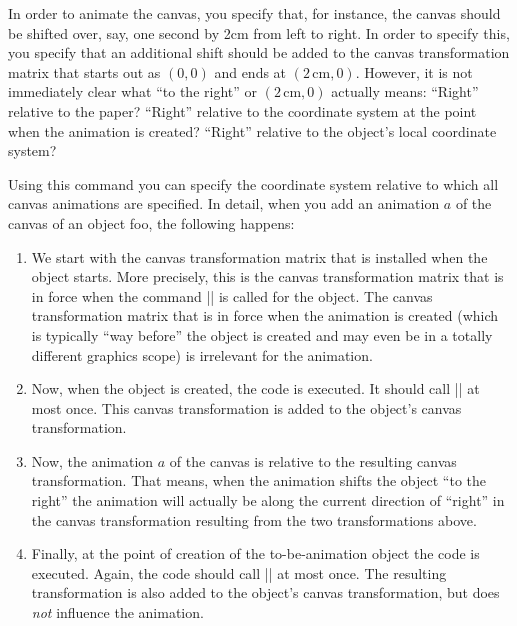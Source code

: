 \begin{command}{\pgfsysanimkeycanvastransform{}}
\end{command}
%
\begin{command}{\pgfsys@animation@canvas@transform{}}
    In order to animate the canvas, you specify that, for instance, the canvas
    should be shifted over, say, one second by 2cm from left to right. In order
    to specify this, you specify that an additional shift should be added to
    the canvas transformation matrix that starts out as $(0,0)$ and ends at
    $(2\,\mathrm{cm},0)$. However, it is not immediately clear what ``to the
    right'' or $(2\,\mathrm{cm},0)$ actually means: ``Right'' relative to the
    paper? ``Right'' relative to the coordinate system at the point when the
    animation is created? ``Right'' relative to the object's local coordinate
    system?

    Using this command you can specify the coordinate system relative to which
    all canvas animations are specified. In detail, when you add an animation
    $a$ of the canvas of an object foo, the following happens:
    \begin{enumerate}
        \item We start with the canvas transformation matrix that is installed
            when the object starts. More precisely, this is the canvas
            transformation matrix that is in force when the command
            |\pgfsys@begin@idscope| is called for the object. The canvas
            transformation matrix that is in force when the animation is
            created (which is typically ``way before'' the object is created
            and may even be in a totally different graphics scope) is
            irrelevant for the animation.
        \item Now, when the object is created, the code  is executed.
            It should call |\pgfsys@transformcm| at most once. This canvas
            transformation is added to the object's canvas transformation.
        \item Now, the animation $a$ of the canvas is relative to the resulting
            canvas transformation. That means, when the animation shifts the
            object ``to the right'' the animation will actually be along the
            current direction of ``right'' in the canvas transformation
            resulting from the two transformations above.
        \item Finally, at the point of creation of the to-be-animation object
            the code  is executed. Again, the code should call
            |\pgfsys@transformcm| at most once. The resulting transformation is
            also added to the object's canvas transformation, but does
            \emph{not} influence the animation.
    \end{enumerate}


\end{command}
